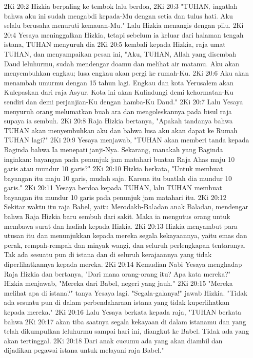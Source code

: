 2Ki 20:2  Hizkia berpaling ke tembok lalu berdoa,
2Ki 20:3  "TUHAN, ingatlah bahwa aku ini sudah mengabdi kepada-Mu dengan setia dan tulus hati. Aku selalu berusaha menuruti kemauan-Mu." Lalu Hizkia menangis dengan pilu.
2Ki 20:4  Yesaya meninggalkan Hizkia, tetapi sebelum ia keluar dari halaman tengah istana, TUHAN menyuruh dia
2Ki 20:5  kembali kepada Hizkia, raja umat TUHAN, dan menyampaikan pesan ini, "Aku, TUHAN, Allah yang disembah Daud leluhurmu, sudah mendengar doamu dan melihat air matamu. Aku akan menyembuhkan engkau; lusa engkau akan pergi ke rumah-Ku.
2Ki 20:6  Aku akan menambah umurmu dengan 15 tahun lagi. Engkau dan kota Yerusalem akan Kulepaskan dari raja Asyur. Kota ini akan Kulindungi demi kehormatan-Ku sendiri dan demi perjanjian-Ku dengan hamba-Ku Daud."
2Ki 20:7  Lalu Yesaya menyuruh orang melumatkan buah ara dan mengoleskannya pada bisul raja supaya ia sembuh.
2Ki 20:8  Raja Hizkia bertanya, "Apakah tandanya bahwa TUHAN akan menyembuhkan aku dan bahwa lusa aku akan dapat ke Rumah TUHAN lagi?"
2Ki 20:9  Yesaya menjawab, "TUHAN akan memberi tanda kepada Baginda bahwa Ia menepati janji-Nya. Sekarang, manakah yang Baginda inginkan: bayangan pada penunjuk jam matahari buatan Raja Ahas maju 10 garis atau mundur 10 garis?"
2Ki 20:10  Hizkia berkata, "Untuk membuat bayangan itu maju 10 garis, mudah saja. Karena itu buatlah dia mundur 10 garis."
2Ki 20:11  Yesaya berdoa kepada TUHAN, lalu TUHAN membuat bayangan itu mundur 10 garis pada penunjuk jam matahari itu.
2Ki 20:12  Sekitar waktu itu raja Babel, yaitu Merodakh-Baladan anak Baladan, mendengar bahwa Raja Hizkia baru sembuh dari sakit. Maka ia mengutus orang untuk membawa surat dan hadiah kepada Hizkia.
2Ki 20:13  Hizkia menyambut para utusan itu dan menunjukkan kepada mereka segala kekayaannya, yaitu emas dan perak, rempah-rempah dan minyak wangi, dan seluruh perlengkapan tentaranya. Tak ada sesuatu pun di istana dan di seluruh kerajaannya yang tidak diperlihatkannya kepada mereka.
2Ki 20:14  Kemudian Nabi Yesaya menghadap Raja Hizkia dan bertanya, "Dari mana orang-orang itu? Apa kata mereka?" Hizkia menjawab, "Mereka dari Babel, negeri yang jauh."
2Ki 20:15  "Mereka melihat apa di istana?" tanya Yesaya lagi. "Segala-galanya!" jawab Hizkia. "Tidak ada sesuatu pun di dalam perbendaharaan istana yang tidak kuperlihatkan kepada mereka."
2Ki 20:16  Lalu Yesaya berkata kepada raja, "TUHAN berkata bahwa
2Ki 20:17  akan tiba saatnya segala kekayaan di dalam istanamu dan yang telah dikumpulkan leluhurmu sampai hari ini, diangkut ke Babel. Tidak ada yang akan tertinggal.
2Ki 20:18  Dari anak cucumu ada yang akan diambil dan dijadikan pegawai istana untuk melayani raja Babel."
